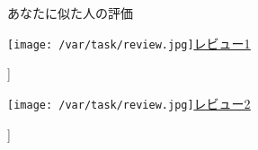 \documentclass[lualatex,paper=a4,airticle]{jlreq}
\begin{document}
\begin{minipage}[b][0.43\textheight][b]{\textwidth}
\begin{multicols}{2}
    
    \hspace{-2.3cm} %
      \begin{minipage}{1.25\columnwidth}
      \begin{itembox}[l]{{\gtfamily\ebseries\large あなたに似た人の評価}}
    
      \vspace{-3mm}
    \texttt{[image: /var/task/review.jpg]}\href{[[review_url21]]}{\color{blue}\underline{レビュー1}}\par
    [[review21]]\par
    \texttt{[image: /var/task/review.jpg]}\href{[[review_url22]]}{\color{blue}\underline{レビュー2}}\par
    [[review22]]\par
    \end{itembox}
      \end{minipage}
    
    \end{multicols}
\end{minipage}
\end{document}
